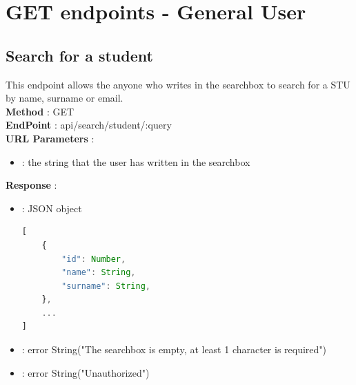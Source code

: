 \section*{GET endpoints - General User}

\subsection*{Search for a student}
This endpoint allows the anyone who writes in the searchbox to search for a STU by name, surname or email.\\
\textbf{Method} : GET \\
\textbf{EndPoint} : api/search/student/:query \\
\textbf{URL Parameters} :
\begin{itemize}
    \item {} : the string that the user has written in the searchbox\\
\end{itemize}
\textbf{Response} :
\begin{itemize}
    \item {} : JSON object
          \begin{lstlisting}[language=JavaScript, label={lst:jscode}, basicstyle=\ttfamily]
[
    {
        "id": Number,
        "name": String,
        "surname": String,
    },
    ...
]
            \end{lstlisting}
    \item {} : error String("The searchbox is empty, at least 1 character is required")
    \item {} : error String("Unauthorized")
\end{itemize}

